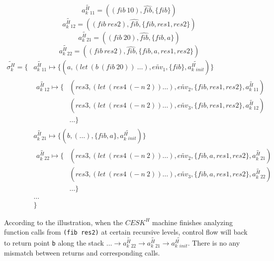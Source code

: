\documentclass{article}
\begin{document}
\[
\widetilde{a^H_k{}_{11}} = ((fib\ 10), \widehat{fib}, \{fib\})
\]
\[
\widetilde{a^H_k{}_{12}} = ((fib\ res2), \widehat{fib}, \{fib, res1, res2\})
\]
\[
\widetilde{a^H_k{}_{21}} = ((fib\ 20), \widehat{fib}, \{fib, a\})
\]
\[
\widetilde{a^H_k{}_{22}} = ((fib\ res2), \widehat{fib}, \{fib, a, res1, res2\})
\]
\[
\begin{aligned}
\widetilde{\sigma_k^H} = \{ {}& \widetilde{a^H_k{}_{11}} \mapsto \{(a, (let\ (b\ (fib\ 20))\ \dots), \widetilde{env_1}, \{fib\}, \widetilde{a^H_k{}_{init}})\}  {} \\
                            &
                            \begin{aligned}
                              \widetilde{a^H_k{}_{12}} \mapsto
                              \{{}& (res3, (let\ (res4\ (-\ n\ 2)) \dots), \widetilde{env_2}, \{fib, res1, res2\}, \widetilde{a^H_k{}_{11}}) {}\\
                              & (res3, (let\ (res4\ (-\ n\ 2)) \dots), \widetilde{env_3}, \{fib, res1, res2\}, \widetilde{a^H_k{}_{12}}) {} \\
                              & \dots
                              \}
                            \end{aligned} {} \\
                            & \widetilde{a^H_k{}_{21}} \mapsto \{(b, (\dots), \{fib, a\}, \widetilde{a^H_k{}_{init}}) \} {}\\
                            &
                            \begin{aligned}
                              \widetilde{a^H_k{}_{22}} \mapsto
                              \{{}& (res3, (let\ (res4\ (-\ n\ 2)) \dots), \widetilde{env_2}, \{fib, a, res1, res2\}, \widetilde{a^H_k{}_{21}}) {}\\
                              & (res3, (let\ (res4\ (-\ n\ 2)) \dots), \widetilde{env_3}, \{fib, a, res1, res2\}, \widetilde{a^H_k{}_{22}}) {} \\
                              & \dots
                              \}
                            \end{aligned} {}\\
                            & \dots {}\\
                            & \}
\end{aligned}
\]

According to the illustration, when the $CESK^H$ machine finishes analyzing function calls from \verb|(fib res2)| at certain recursive levels, control flow will back to return point \verb|b| along the stack $\dots \to \widetilde{a^H_k{}_{22}} \to \widetilde{a^H_k{}_{21}} \to \widetilde{a^H_k{}_{init}}$. There is no any mismatch between returns and corresponding calls.
\end{document}
